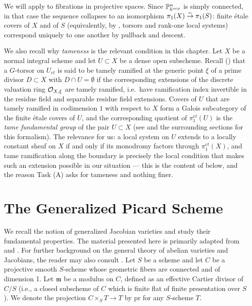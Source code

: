 \begin{bluemath}
We will apply  to fibrations
in projective spaces. Since $\mathbb{P}^n_{k^{sep}}$ is simply connected, in that
case the sequence collapses to an isomorphism $\pi_1(X) \overset{\sim}{\to} \pi_1(S)$:
finite \'etale covers of $X$ and of $S$ (equivalently, by
, torsors and rank-one local
systems) correspond uniquely to one another by pullback and descent.

We also recall why \emph{tameness} is the relevant condition in this
chapter. Let $X$ be a normal integral scheme and let $U \subset X$ be a
dense open subscheme. Recall
() that a $G$-torsor on
$U_{et}$ is said to be tamely ramified at the generic point $\xi$ of a prime
divisor $D \subset X$ with $D \cap U = \emptyset$ if the corresponding
extensions of the discrete valuation ring $\mathcal{O}_{X, \xi}$ are tamely
ramified, i.e.\ have ramification index invertible in the residue field and
separable residue field extensions. Covers of $U$ that are tamely ramified
in codimension $1$ with respect to $X$ form a Galois subcategory of the
finite \'etale covers of $U$, and the corresponding quotient of
$\pi_1^{et}(U)$ is the \emph{tame fundamental group} of the pair $U \subset
X$ (see  and the surrounding sections for this formalism).
The relevance for us: a local system on $U$ extends to a locally constant
sheaf on $X$ if and only if its monodromy factors through $\pi_1^{et}(X)$,
and tame ramification along the boundary is precisely the local condition
that makes such an extension possible in our situation --- this is the
content of  below, and the reason
Task (A) asks for tameness and nothing finer.
\end{bluemath}


\section{The Generalized Picard Scheme}\label{section:generalized_picard}
We recall the notion of generalized Jacobian varieties and study their fundamental properties. The material presented here is primarily adapted from \cite{Guignard2018} and \cite{takeuchi2018blow}. For further background on the general theory of abelian varieties and Jacobians, the reader may also consult \cite{milneAV}.
Let $S$ be a scheme and let $C$ be a projective smooth $S$-scheme whose geometric fibers are connected and of dimension 1. Let $\mathfrak{m}$ be a modulus on $C$, defined as an effective Cartier divisor of $C/S$
(i.e., a closed subscheme of $C$ which is finite flat of finite presentation over $S$).
We denote the projection $C \times_S T \to T$ by $\text{pr}$ for any $S$-scheme $T$.

